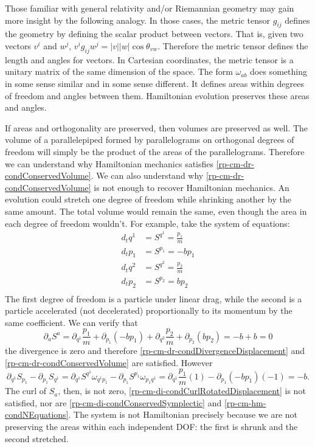 Those familiar with general relativity and/or Riemannian geometry may gain more insight by the following analogy. In those cases, the metric tensor $g_{ij}$ defines the geometry by defining the scalar product between vectors. That is, given two vectors $v^i$ and $w^j$, $v^i g_{ij} w^j = |v| |w| \cos \theta_{vw}$. Therefore the metric tensor defines the length and angles for vectors. In Cartesian coordinates, the metric tensor is a unitary matrix of the same dimension of the space. The form $\omega_{ab}$ does something in some sense similar and in some sense different. It defines areas within degrees of freedom and angles between them. Hamiltonian evolution preserves these areas and angles.

If areas and orthogonality are preserved, then volumes are preserved as well. The volume of a parallelepiped formed by parallelograms on orthogonal degrees of freedom will simply be the product of the areas of the parallelograms. Therefore we can understand why Hamiltonian mechanics satisfies \ref{rp-cm-dr-condConservedVolume}. We can also understand why \ref{rp-cm-dr-condConservedVolume} is not enough to recover Hamiltonian mechanics. An evolution could stretch one degree of freedom while shrinking another by the same amount. The total volume would remain the same, even though the area in each degree of freedom wouldn't. For example, take the system of equations:
\begin{equation}
	\begin{aligned}
	d_t q^1 &= S^{q^1} = \frac{p_1}{m} \\
	d_t p_1 &= S^{p_1} = - b p_1 \\
	d_t q^2 &= S^{q^2} = \frac{p_2}{m} \\
	d_t p_2 &= S^{p_2} = b p_2 \\
	\end{aligned}
\end{equation}
The first degree of freedom is a particle under linear drag, while the second is a particle accelerated (not decelerated) proportionally to its momentum by the same coefficient. We can verify that
\begin{equation}
	\partial_a S^a = \partial_{q^1} \frac{p_1}{m} + \partial_{p_1} (-b p_1) + \partial_{q^2} \frac{p_2}{m} + \partial_{p_2} (b p_2) = - b +b = 0
\end{equation}
the divergence is zero and therefore \ref{rp-cm-dr-condDivergenceDisplacement} and \ref{rp-cm-dr-condConservedVolume} are satisfied. However
\begin{equation}
	\partial_{q^1} S_{p_1} - \partial_{p_1} S_{q^1} = \partial_{q^1} S^{q^1} \omega_{q^1 p_1} - \partial_{p_1} S^{p_1} \omega_{p_1 q^1} = \partial_{q^1} \frac{p_1}{m} (1) - \partial_{p_1} (-b p_1) (-1) = -b.
\end{equation}
The curl of $S_a$, then, is not zero, \ref{rp-cm-di-condCurlRotatedDisplacement} is not satisfied, nor are \ref{rp-cm-di-condConservedSymplectic} and \ref{rp-cm-hm-condNEquations}. The system is not Hamiltonian precisely because we are not preserving the areas within each independent DOF: the first is shrunk and the second stretched.

